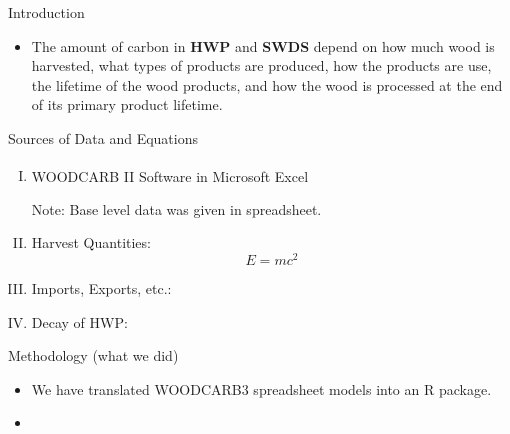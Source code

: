 \documentclass[final]{beamer}\usepackage[]{graphicx}\usepackage[]{color}
\newlength{\onecolwid}
\begin{document}
\begin{frame}[t]
\begin{columns}[t]
\begin{column}{\onecolwid}
\begin{alertblock}{Introduction}
\begin{itemize}
\item The amount of carbon in \textbf{HWP} and \textbf{SWDS} depend on how much wood is harvested, what types of products are produced, how the products are use, the lifetime of the wood products, and how the wood is processed at the end of its primary product lifetime.

\end{itemize}
\end{alertblock}


\begin{block}{Sources of Data and Equations}

\begin{enumerate}[I.]
\item WOODCARB II Software in Microsoft Excel\textsuperscript{\textregistered}

\vspace{0ex}
Note: Base level data was given in spreadsheet. 
\item Harvest Quantities: 
\begin{equation}
E = mc^{2}
\label{eqn:Einstein}
\end{equation}
\item Imports, Exports, etc.:
\item Decay of HWP:
\end{enumerate}
\vspace{0ex}

\end{block}
\vfill

\begin{block}{Methodology (what we did)}
\begin{itemize}
\item We have translated WOODCARB3 spreadsheet models into an R package.
\vspace{1ex}
\item  
\vspace{1ex}
\end{itemize}
\vspace{0ex}
\vfill

\end{block}


\end{column}
\end{columns}
\end{frame}
\end{document}
